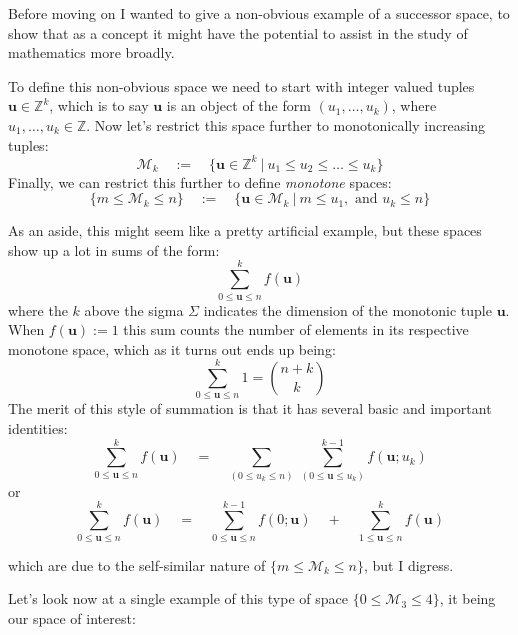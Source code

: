 \documentclass[twoside]{article}
\begin{document}
Before moving on I wanted to give a non-obvious example of a successor space, to show that as a concept it might have
the potential to assist in the study of mathematics more broadly.

To define this non-obvious space we need to start with integer valued tuples $ {\mathbf u}\in\mathbb{Z}^k $,
which is to say $ {\mathbf u} $ is an object of the form $ (u_1,\ldots,u_k) $, where $ u_1,\ldots,u_k\in\mathbb{Z} $.
Now let's restrict this space further to monotonically increasing tuples:
$$ \mathcal{M}_k\quad:=\quad\{ {\mathbf u}\in\mathbb{Z}^k\ |\ u_1\le u_2\le\ldots\le u_k \} $$
Finally, we can restrict this further to define \emph{monotone} spaces:
$$ \{m\le\mathcal{M}_k\le n\}\quad:=\quad\{ {\mathbf u}\in\mathcal{M}_k\ |\ m\le u_1,\mbox{ and } u_k\le n \}  $$

As an aside, this might seem like a pretty artificial example, but these spaces show up a lot in sums of the form:
$$ \sum_{0\le{\mathbf u}\le n}^k f({\mathbf u}) $$
where the $ k $ above the sigma $ \Sigma $ indicates the dimension of the monotonic tuple $ {\mathbf u} $.
When $ f({\mathbf u}) := 1 $ this sum counts the number of elements in its respective monotone space,
which as it turns out ends up being:
$$ \sum_{0\le{\mathbf u}\le n}^k 1 = {n+k \choose k} $$
The merit of this style of summation is that it has several basic and important identities:
$$ \sum_{0\le{\mathbf u}\le n}^k f({\mathbf u})\quad =\quad
   \sum_{(0\le u_k\le n)}\,\sum_{(0\le{\mathbf u}\le u_k)}^{k-1} f({\mathbf u}; u_k) $$
or
$$ \sum_{0\le{\mathbf u}\le n}^k f({\mathbf u})\quad =\quad
   \sum_{0\le{\mathbf u}\le n}^{k-1} f(0; {\mathbf u})\quad +\quad \sum_{1\le{\mathbf u}\le n}^k f({\mathbf u}) $$

\noindent which are due to the self-similar nature of $ \{m\le\mathcal{M}_k\le n\} $, but I digress.

\newpage

Let's look now at a single example of this type of space $ \{0\le\mathcal{M}_3\le 4\} $, it being our space of interest:
\end{document}
